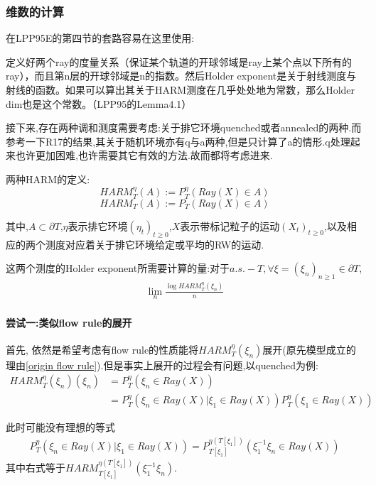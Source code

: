 \documentclass[a4paper,oneside]{ctexbook}
\begin{document}
		\subsubsection*{维数的计算}

			在LPP95E的第四节的套路容易在这里使用:

			定义好两个ray的度量关系（保证某个轨道的开球邻域是ray上某个点以下所有的ray），而且第n层的开球邻域是n的指数。然后Holder exponent是关于射线测度与射线的函数。如果可以算出其关于HARM测度在几乎处处地为常数，那么Holder dim也是这个常数。（LPP95的Lemma4.1）

			接下来,存在两种调和测度需要考虑:关于排它环境quenched或者annealed的两种.而参考一下R17的结果,其关于随机环境亦有q与a两种,但是只计算了a的情形.q处理起来也许更加困难,也许需要其它有效的方法.故而都将考虑进来.

			两种HARM的定义:
			$$HARM^{\eta}_T(A) := P^{\eta}_T(Ray(X)\in A)$$
			$$HARM_T(A) := P_T(Ray(X)\in A)$$

			其中,$A \subset \partial T$,$\eta$表示排它环境$(\eta_t)_{t \ge 0}$,$X$表示带标记粒子的运动$(X_t)_{t \ge 0}$,以及相应的两个测度对应着关于排它环境给定或平均的RW的运动.

			这两个测度的Holder exponent所需要计算的量:对于$a.s. - T, \forall \xi = (\xi_n)_{n \ge 1} \in \partial T$,
			\begin{align}
				\lim\limits_{n}\frac{\log HARM^{\eta}_T(\xi_n)}{n}
				\label{holderexponent}
			\end{align}


			\paragraph*{尝试一:类似flow rule的展开}
			\quad %

				首先, 依然是希望考虑有flow rule的性质能将$HARM^{\eta}_T(\xi_n)$展开(原先模型成立的理由\ref{origin flow rule}).但是事实上展开的过程会有问题,以quenched为例:
				\begin{align*}
					HARM^{\eta}_T(\xi_n)(\xi_n) &= P^{\eta}_T( \xi_n \in Ray(X) ) \\
					&= P^{\eta}_T( \xi_n \in Ray(X) | \xi_1 \in Ray(X))  P^{\eta}_T( \xi_1 \in Ray(X) )
				\end{align*}
				
				此时可能没有理想的等式
				\begin{align}
					P^{\eta}_T( \xi_n \in Ray(X) | \xi_1 \in Ray(X)) 
					= P^{\eta(T[\xi_1])}_{T[\xi_1]}( \xi_1^{-1}\xi_n \in Ray(X) )
					\label{shiftdown}
				\end{align}
				其中右式等于$HARM^{\eta(T[\xi_1])}_{T[\xi_1]}(\xi_1^{-1}\xi_n)$.
\end{document}

